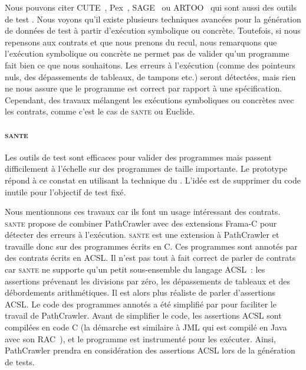 Nous pouvons citer CUTE~, Pex~,
SAGE~ ou ARTOO~ qui sont aussi des outils
de test . Nous voyons qu'il existe plusieurs techniques
avancées pour la génération de données de test à partir d'exécution symbolique
ou concrète. Toutefois, si nous repensons aux contrats et que nous prenons du
recul, nous remarquons que l'exécution symbolique ou concrète ne permet pas de
valider qu'un programme fait bien ce que nous souhaitons. Les erreurs à
l'exécution (comme des pointeurs nuls, des dépassements de tableaux, de tampons
etc.) seront détectées, mais rien ne nous assure que le programme est correct
par rapport à une spécification. Cependant, des travaux mélangent les exécutions
symboliques ou concrètes avec les contrats, comme c'est le cas de {\scshape
sante} ou Euclide.

\paragraph{\scshape sante} Les outils de test  sont
efficaces pour valider des programmes mais passent difficilement à l'échelle sur
des programmes de taille importante. Le prototype~~ répond à ce constat en utilisant la technique du
. L'idée est de supprimer du code inutile pour l'objectif de
test fixé.

Nous mentionnons ces travaux car ils font un usage intéressant des contrats.
{\scshape sante} propose de combiner PathCrawler avec des extensions Frama-C
pour détecter des erreurs à l'exécution. {\scshape sante} est une extension à
PathCrawler et travaille donc sur des programmes écrits en C. Ces programmes
sont annotés par des contrats écrits en ACSL. Il n'est pas tout à fait correct
de parler de contrats car {\scshape sante} ne supporte qu'un petit sous-ensemble
du langage ACSL~: les assertions prévenant les divisions par zéro, les
dépassements de tableaux et des débordements arithmétiques. Il est alors plus
réaliste de parler d'assertions ACSL. Le code des programmes annotés a été
simplifié par  pour faciliter le travail de PathCrawler.
Avant de simplifier le code, les assertions ACSL sont compilées en code C (la
démarche est similaire à JML qui est compilé en Java avec son
RAC~), et le programme est instrumenté pour les exécuter.
Ainsi, PathCrawler prendra en considération des assertions ACSL lors de la
génération de tests.

